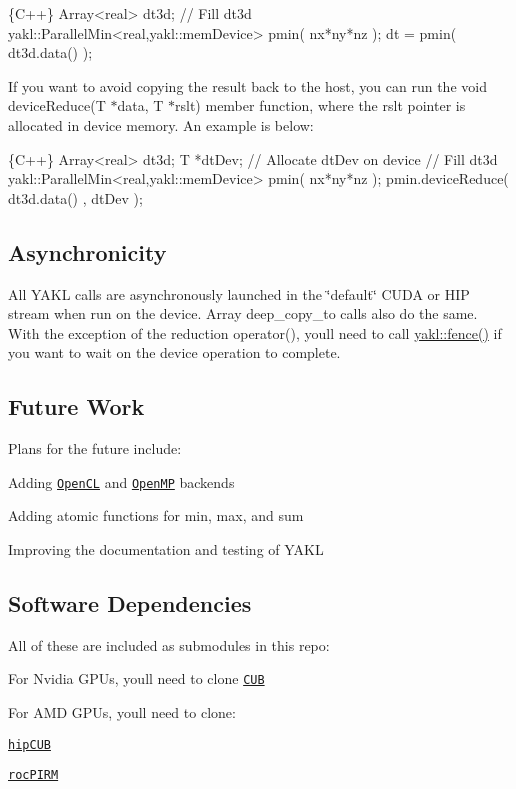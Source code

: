 \begin{DoxyCode}
\{C++\}
Array<real> dt3d;
// Fill dt3d
yakl::ParallelMin<real,yakl::memDevice> pmin( nx*ny*nz );
dt = pmin( dt3d.data() );
\end{DoxyCode}


If you want to avoid copying the result back to the host, you can run the {\ttfamily void device\+Reduce(\+T $\ast$data, T $\ast$rslt)} member function, where the {\ttfamily rslt} pointer is allocated in device memory. An example is below\+:


\begin{DoxyCode}
\{C++\}
Array<real> dt3d;
T *dtDev;
// Allocate dtDev on device
// Fill dt3d
yakl::ParallelMin<real,yakl::memDevice> pmin( nx*ny*nz );
pmin.deviceReduce( dt3d.data() , dtDev );
\end{DoxyCode}


\subsection*{Asynchronicity}

All Y\+A\+KL calls are asynchronously launched in the \char`\"{}default\char`\"{} C\+U\+DA or H\+IP stream when run on the device. Array {\ttfamily deep\+\_\+copy\+\_\+to} calls also do the same. With the exception of the reduction {\ttfamily operator()}, you\textquotesingle{}ll need to call {\ttfamily \hyperlink{namespaceyakl_a5debd8fe5fff4f37c06e55648d138e0c}{yakl\+::fence()}} if you want to wait on the device operation to complete.

\subsection*{Future Work}

Plans for the future include\+:
\begin{DoxyItemize}
\item Adding \href{https://www.khronos.org/opencl/}{\tt Open\+CL} and \href{https://www.openmp.org/}{\tt Open\+MP} backends
\item Adding atomic functions for min, max, and sum
\item Improving the documentation and testing of Y\+A\+KL
\end{DoxyItemize}

\subsection*{Software Dependencies}

All of these are included as submodules in this repo\+:
\begin{DoxyItemize}
\item For Nvidia G\+P\+Us, you\textquotesingle{}ll need to clone \href{https://nvlabs.github.io/cub/}{\tt C\+UB}
\item For A\+MD G\+P\+Us, you\textquotesingle{}ll need to clone\+:
\begin{DoxyItemize}
\item \href{https://github.com/ROCmSoftwarePlatform/hipCUB}{\tt hip\+C\+UB}
\item \href{https://github.com/ROCmSoftwarePlatform/rocPRIM}{\tt roc\+P\+I\+RM} 
\end{DoxyItemize}
\end{DoxyItemize}